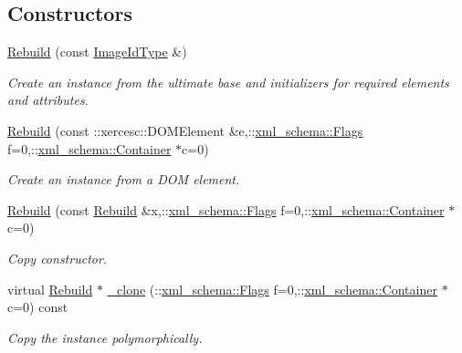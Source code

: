 \subsection*{Constructors}
\begin{DoxyCompactItemize}
\item 
\hypertarget{classopenstack_1_1xml_1_1Rebuild_a82865817308389f208e776af605d0445}{
\hyperlink{classopenstack_1_1xml_1_1Rebuild_a82865817308389f208e776af605d0445}{Rebuild} (const \hyperlink{classopenstack_1_1xml_1_1Rebuild_a8896fc0d560d689eedce7af71136c4dc}{ImageIdType} \&)}
\label{classopenstack_1_1xml_1_1Rebuild_a82865817308389f208e776af605d0445}

\begin{DoxyCompactList}\small\item\em Create an instance from the ultimate base and initializers for required elements and attributes. \item\end{DoxyCompactList}\item 
\hyperlink{classopenstack_1_1xml_1_1Rebuild_aef4239ae1018f842dad191f8a90acfc0}{Rebuild} (const ::xercesc::DOMElement \&e,::\hyperlink{namespacexml__schema_affb4c227cbd9aa7453dd1dc5a1401943}{xml\_\-schema::Flags} f=0,::\hyperlink{namespacexml__schema_a333dea2213742aea47a37532dec4ec27}{xml\_\-schema::Container} $\ast$c=0)
\begin{DoxyCompactList}\small\item\em Create an instance from a DOM element. \item\end{DoxyCompactList}\item 
\hyperlink{classopenstack_1_1xml_1_1Rebuild_aeec4eadb3ed016f22cbdac88ca857356}{Rebuild} (const \hyperlink{classopenstack_1_1xml_1_1Rebuild}{Rebuild} \&x,::\hyperlink{namespacexml__schema_affb4c227cbd9aa7453dd1dc5a1401943}{xml\_\-schema::Flags} f=0,::\hyperlink{namespacexml__schema_a333dea2213742aea47a37532dec4ec27}{xml\_\-schema::Container} $\ast$c=0)
\begin{DoxyCompactList}\small\item\em Copy constructor. \item\end{DoxyCompactList}\item 
virtual \hyperlink{classopenstack_1_1xml_1_1Rebuild}{Rebuild} $\ast$ \hyperlink{classopenstack_1_1xml_1_1Rebuild_aabf564dff83df8dfdf008fb1aee69dcd}{\_\-clone} (::\hyperlink{namespacexml__schema_affb4c227cbd9aa7453dd1dc5a1401943}{xml\_\-schema::Flags} f=0,::\hyperlink{namespacexml__schema_a333dea2213742aea47a37532dec4ec27}{xml\_\-schema::Container} $\ast$c=0) const 
\begin{DoxyCompactList}\small\item\em Copy the instance polymorphically. \item\end{DoxyCompactList}\end{DoxyCompactItemize}


